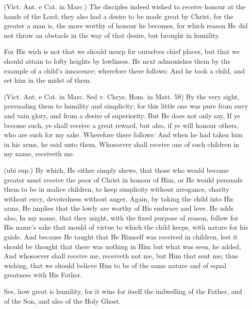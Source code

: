  (Vict. Ant. e Cat. in Marc.) The disciples indeed wished to receive honour at the hands of the Lord; they also had a desire to be made great by Christ, for the greater a man is, the more worthy of honour he becomes, for which reason He did not throw an obstacle in the way of that desire, but brought in humility.

 For His wish is not that we should usurp for ourselves chief places, but that we should attain to lofty heights by lowliness. He next admonishes them by the example of a child’s innocence; wherefore there follows: And he took a child, and set him in the midst of them.

 (Vict. Ant. e Cat. in Marc. Sed v. Chrys. Hom. in Matt. 58) By the very sight, persuading them to humility and simplicity; for this little one was pure from envy and vain glory, and from a desire of superiority. But He does not only say, If ye become such, ye shall receive a great reward, but also, if ye will honour others, who are such for my sake. Wherefore there follows: And when he had taken him in his arms, he said unto them, Whosoever shall receive one of such children in my name, receiveth me.

 (ubi sup.) By which, He either simply shews, that those who would become greater must receive the poor of Christ in honour of Him, or He would persuade them to be in malice children, to keep simplicity without arrogance, charity without envy, devotedness without anger. Again, by taking the child into His arms, He implies that the lowly are worthy of His embrace and love. He adds also, In my name, that they might, with the fixed purpose of reason, follow for His name’s sake that mould of virtue to which the child keeps, with nature for his guide. And because He taught that He Himself was received in children, lest it should be thought that there was nothing in Him but what was seen, he added, And whosoever shall receive me, receiveth not me, but Him that sent me; thus wishing, that we should believe Him to be of the same nature and of equal greatness with His Father.

 See, how great is humility, for it wins for itself the indwelling of the Father, and of the Son, and also of the Holy Ghost.

 

